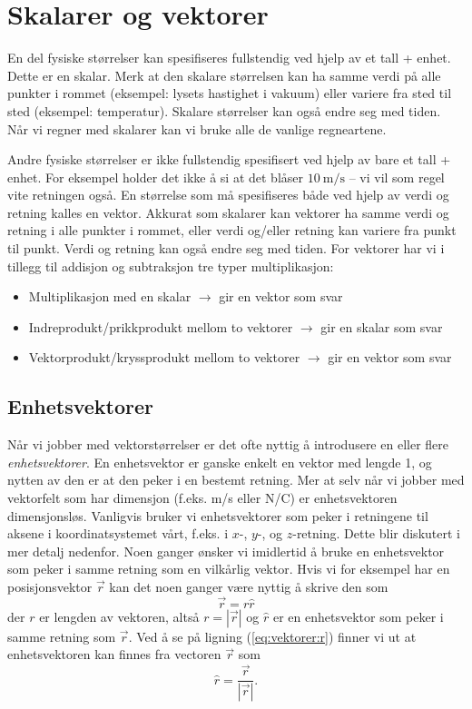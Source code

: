 \documentclass[a4paper,norsk,12pt]{book}
\begin{document}
\chapter{Skalarer og vektorer}
En del fysiske størrelser kan spesifiseres fullstendig ved hjelp av et tall + enhet. Dette er en skalar. Merk at den skalare størrelsen kan ha samme verdi på alle punkter i rommet (eksempel: lysets hastighet i vakuum) eller variere fra sted til sted (eksempel: temperatur). Skalare størrelser kan også endre seg med tiden. Når vi regner med skalarer kan vi bruke alle de vanlige regneartene.

Andre fysiske størrelser er ikke fullstendig spesifisert ved hjelp av bare et tall + enhet. For eksempel holder det ikke å si at det blåser $10~\mathrm{m/s}$ -- vi vil som regel vite retningen også. En størrelse som må spesifiseres både ved hjelp av verdi og retning kalles en vektor. Akkurat som skalarer kan vektorer ha samme verdi og retning i alle punkter i rommet, eller verdi og/eller retning kan variere fra punkt til punkt. Verdi og retning kan også endre seg med tiden. For vektorer har vi i tillegg til addisjon og subtraksjon tre typer multiplikasjon:
\begin{itemize}
\item Multiplikasjon med en skalar $\to$ gir en vektor som svar
\item Indreprodukt/prikkprodukt mellom to vektorer $\to$ gir en skalar som svar
\item Vektorprodukt/kryssprodukt mellom to vektorer $\to$ gir en vektor som svar
\end{itemize}

\section{Enhetsvektorer}
Når vi jobber med vektorstørrelser er det ofte nyttig å introdusere en eller flere \emph{enhetsvektorer}. En enhetsvektor er ganske enkelt en vektor med lengde 1, og nytten av den er at den peker i en bestemt retning. Mer at selv når vi jobber med vektorfelt som har dimensjon (f.eks. m/s eller N/C) er enhetsvektoren dimensjonsløs. Vanligvis bruker vi enhetsvektorer som peker i retningene til aksene i koordinatsystemet vårt, f.eks. i $x$-, $y$-, og $z$-retning. Dette blir diskutert i mer detalj nedenfor. Noen ganger ønsker vi imidlertid å bruke en enhetsvektor som peker i samme retning som en vilkårlig vektor. Hvis vi for eksempel har en posisjonsvektor $\vec{r}$ kan det noen ganger være nyttig å skrive den som 
\begin{equation}
	\vec{r} = r \hat{r}
	\label{eq:vektorer:r}
\end{equation}
der $r$ er lengden av vektoren, altså $r = |\vec{r}|$ og $\hat{r}$ er en enhetsvektor som peker i samme retning som $\vec{r}$. Ved å se på ligning (\ref{eq:vektorer:r}) finner vi ut at enhetsvektoren kan finnes fra vectoren $\vec{r}$ som
\begin{displaymath}
	\hat{r} = \frac{\vec{r}}{|\vec{r}|}.
\end{displaymath}
\end{document}
